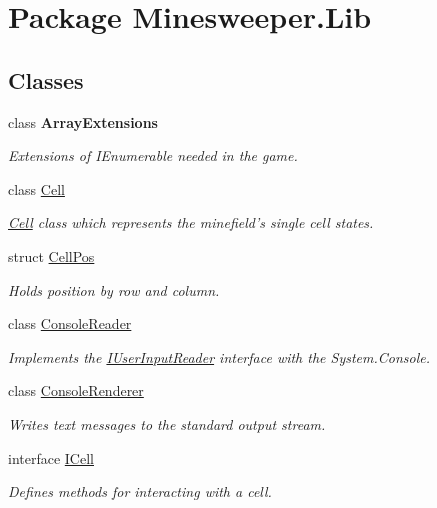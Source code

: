 \hypertarget{namespace_minesweeper_1_1_lib}{\section{Package Minesweeper.\+Lib}
\label{namespace_minesweeper_1_1_lib}
}
\subsection*{Classes}
\begin{DoxyCompactItemize}
\item 
class {\bfseries Array\+Extensions}
\begin{DoxyCompactList}\small\item\em Extensions of I\+Enumerable needed in the game. \end{DoxyCompactList}\item 
class \hyperlink{class_minesweeper_1_1_lib_1_1_cell}{Cell}
\begin{DoxyCompactList}\small\item\em \hyperlink{class_minesweeper_1_1_lib_1_1_cell}{Cell} class which represents the minefield's single cell states. \end{DoxyCompactList}\item 
struct \hyperlink{struct_minesweeper_1_1_lib_1_1_cell_pos}{Cell\+Pos}
\begin{DoxyCompactList}\small\item\em Holds position by row and column. \end{DoxyCompactList}\item 
class \hyperlink{class_minesweeper_1_1_lib_1_1_console_reader}{Console\+Reader}
\begin{DoxyCompactList}\small\item\em Implements the \hyperlink{interface_minesweeper_1_1_lib_1_1_i_user_input_reader}{I\+User\+Input\+Reader} interface with the System.\+Console. \end{DoxyCompactList}\item 
class \hyperlink{class_minesweeper_1_1_lib_1_1_console_renderer}{Console\+Renderer}
\begin{DoxyCompactList}\small\item\em Writes text messages to the standard output stream. \end{DoxyCompactList}\item 
interface \hyperlink{interface_minesweeper_1_1_lib_1_1_i_cell}{I\+Cell}
\begin{DoxyCompactList}\small\item\em Defines methods for interacting with a cell. \end{DoxyCompactList}\item 

\end{DoxyCompactItemize}
